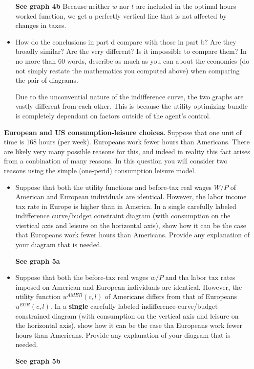 \documentclass[11pt]{SelfArxOneColBMN}
\begin{document}
\begin{exercise}
\begin{itemize}
		\begin{solution}
			\textbf{See graph 4b} Because neither $w$ nor $t$ are included in the optimal hours worked function, we get a perfectly vertical line that is not affected by changes in taxes.
		\end{solution}
		\item How do the conclusions in part d compare with those in part b? Are they broadly similar? Are the very different? Is it impossible to compare them? In no more than 60 words, describe as much as you can about the economics (do not simply restate the mathematics you computed above) when comparing the pair of diagrams.
		\begin{solution}
			Due to the unconvential nature of the indifference curve, the two graphs are vastly different from each other. This is because the utility optimizing bundle is completely dependant on factors outside of the agent's control.
		\end{solution}
	\end{itemize}
\end{exercise}
\begin{exercise}
	\textbf{European and US consumption-leisure choices.} Suppose that one unit of time is 168 hours (per week). Europeans work fewer hours than Americans. There are likely very many possible reasons for this, and indeed in reality this fact arises from a conbination of many reasons. In this question you will consider two reasons using the simple (one-perid) consumption leisure model.
	\begin{itemize}
		\item Suppose that both the utility functions and before-tax real wages $W / P$ of American and European individuals are identical. However, the labor income tax rate in Europe is higher than in America. In a single carefully labeled indifference curve/budget constraint diagram (with consumption on the viertical axis and leisure on the horizontal axis), show how it can be the case that Europeans work fewer hours than Americans. Provide any explanation of your diagram that is needed.
		\begin{solution}
			\textbf{See graph 5a}
		\end{solution}
		\item Suppose that both the before-tax real wages $w / P$ and tha labor tax rates imposed on American and European individuals are identical. However, the utility function $u^{AMER}(c,l)$ of Americans differs from that of Europeans $u^{EUR}(c,l)$. In a \textbf{single} carefully labeled indifference-curve/budget constrained diagram (with consumption on the vertical axis and leisure on the horizontal axis), show how it can be the case tha Europeans work fewer hours than Americans. Provide any explanation of your diagram that is needed. 
		\begin{solution}
                        \textbf{See graph 5b}
                \end{solution}
	\end{itemize}
\end{exercise}
\end{document}
